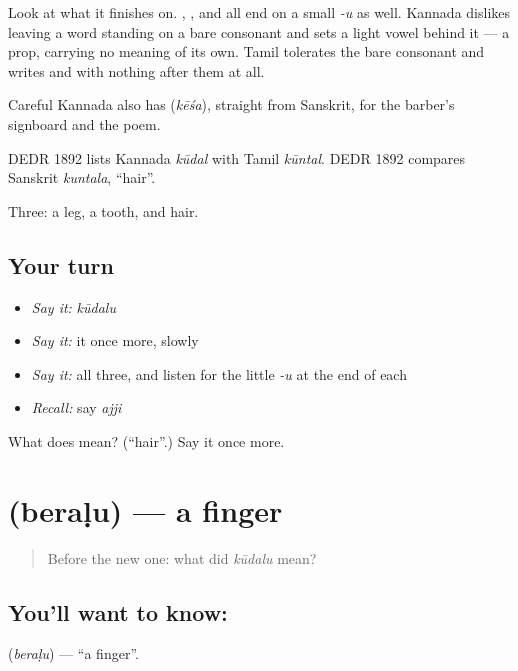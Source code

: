 Look at what it finishes on. , ,  and  all end on a small \emph{-u} as well. Kannada dislikes leaving a word standing on a bare consonant and sets a light vowel behind it — a prop, carrying no meaning of its own. Tamil tolerates the bare consonant and writes  and  with nothing after them at all.

Careful Kannada also has  (\emph{kēśa}), straight from Sanskrit, for the barber's signboard and the poem.

DEDR 1892 lists Kannada \emph{kūdal} with Tamil \emph{kūntal}. DEDR 1892 compares Sanskrit \emph{kuntala}, \textquotedblleft{}hair\textquotedblright{}.

\begin{grammarlens}[title={What you've built}]
Three: a leg, a tooth, and hair.
\end{grammarlens}

\subsection*{Your turn}
\begin{itemize}
\raggedright
  \item \emph{Say it:} \emph{kūdalu}
  \item \emph{Say it:} it once more, slowly
  \item \emph{Say it:} all three, and listen for the little \emph{-u} at the end of each
  \item \emph{Recall:} say \emph{ajji}
\end{itemize}

\begin{tcolorbox}[breakable,colback=teal!4,colframe=teal!35!black,title={Before you move on}]
What does  mean? (\textquotedblleft{}hair\textquotedblright{}.) Say it once more.
\end{tcolorbox}
\section[\texorpdfstring{\kn{ಬೆರಳು} (beraḷu)}{ಬೆರಳು (beraḷu)}]{ (beraḷu) — a finger}

\label{lesson:KA-C47-finger}



\begin{quote}
Before the new one: what did \emph{kūdalu} mean?
\end{quote}

\subsection*{You'll want to know: }
\textbf{} (\emph{beraḷu}) — \textquotedblleft{}a finger\textquotedblright{}.

